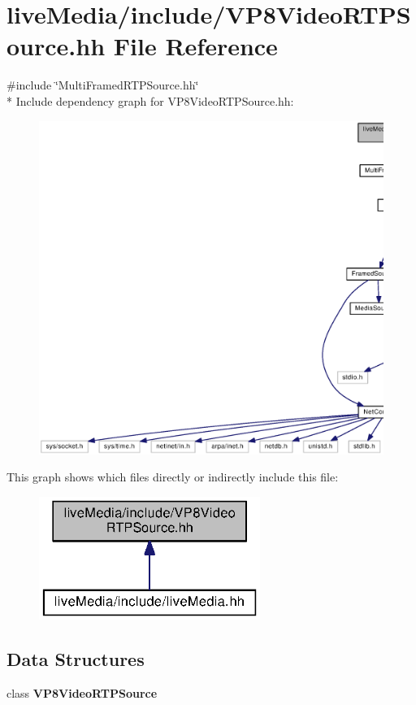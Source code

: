\section{live\+Media/include/\+V\+P8\+Video\+R\+T\+P\+Source.hh File Reference}
\label{VP8VideoRTPSource_8hh}
{\ttfamily \#include \char`\"{}Multi\+Framed\+R\+T\+P\+Source.\+hh\char`\"{}}\\*
Include dependency graph for V\+P8\+Video\+R\+T\+P\+Source.\+hh\+:
\nopagebreak
\begin{figure}[H]
\begin{center}
\leavevmode
\includegraphics[width=350pt]{VP8VideoRTPSource_8hh__incl}
\end{center}
\end{figure}
This graph shows which files directly or indirectly include this file\+:
\nopagebreak
\begin{figure}[H]
\begin{center}
\leavevmode
\includegraphics[width=204pt]{VP8VideoRTPSource_8hh__dep__incl}
\end{center}
\end{figure}
\subsection*{Data Structures}
\begin{DoxyCompactItemize}
\item 
class {\bf V\+P8\+Video\+R\+T\+P\+Source}
\end{DoxyCompactItemize}
